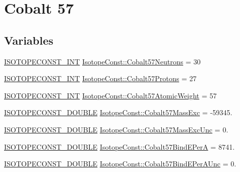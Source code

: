 \hypertarget{group___isotope_const-_cobalt-_co57}{}\section{Cobalt 57}
\label{group___isotope_const-_cobalt-_co57}
\subsection*{Variables}
\begin{DoxyCompactItemize}
\item 
\mbox{\hyperlink{group___isotope_const-_macros_ga5f18360b3e99483a35c32d789e62621c}{I\+S\+O\+T\+O\+P\+E\+C\+O\+N\+S\+T\+\_\+\+I\+NT}} \mbox{\hyperlink{group___isotope_const-_cobalt-_co57_gaf9f2bfeb3f2106f8ab6670a634de59d5}{Isotope\+Const\+::\+Cobalt57\+Neutrons}} = 30
\item 
\mbox{\hyperlink{group___isotope_const-_macros_ga5f18360b3e99483a35c32d789e62621c}{I\+S\+O\+T\+O\+P\+E\+C\+O\+N\+S\+T\+\_\+\+I\+NT}} \mbox{\hyperlink{group___isotope_const-_cobalt-_co57_ga35d91829ff3ccdaa6d97574cc31b4383}{Isotope\+Const\+::\+Cobalt57\+Protons}} = 27
\item 
\mbox{\hyperlink{group___isotope_const-_macros_ga5f18360b3e99483a35c32d789e62621c}{I\+S\+O\+T\+O\+P\+E\+C\+O\+N\+S\+T\+\_\+\+I\+NT}} \mbox{\hyperlink{group___isotope_const-_cobalt-_co57_gaead28edadef46c2ac4f55f1cf5341ceb}{Isotope\+Const\+::\+Cobalt57\+Atomic\+Weight}} = 57
\item 
\mbox{\hyperlink{group___isotope_const-_macros_ga8f45a7272ce02c0b4c65c44636ed719a}{I\+S\+O\+T\+O\+P\+E\+C\+O\+N\+S\+T\+\_\+\+D\+O\+U\+B\+LE}} \mbox{\hyperlink{group___isotope_const-_cobalt-_co57_ga7a65953d01a391d9e60573553a00bcb0}{Isotope\+Const\+::\+Cobalt57\+Mass\+Exc}} = -\/59345.
\item 
\mbox{\hyperlink{group___isotope_const-_macros_ga8f45a7272ce02c0b4c65c44636ed719a}{I\+S\+O\+T\+O\+P\+E\+C\+O\+N\+S\+T\+\_\+\+D\+O\+U\+B\+LE}} \mbox{\hyperlink{group___isotope_const-_cobalt-_co57_ga2180609495ba6f08e9964a3a653fb457}{Isotope\+Const\+::\+Cobalt57\+Mass\+Exc\+Unc}} = 0.
\item 
\mbox{\hyperlink{group___isotope_const-_macros_ga8f45a7272ce02c0b4c65c44636ed719a}{I\+S\+O\+T\+O\+P\+E\+C\+O\+N\+S\+T\+\_\+\+D\+O\+U\+B\+LE}} \mbox{\hyperlink{group___isotope_const-_cobalt-_co57_ga9387a90246b617ee416653e8ad1910b0}{Isotope\+Const\+::\+Cobalt57\+Bind\+E\+PerA}} = 8741.
\item 
\mbox{\hyperlink{group___isotope_const-_macros_ga8f45a7272ce02c0b4c65c44636ed719a}{I\+S\+O\+T\+O\+P\+E\+C\+O\+N\+S\+T\+\_\+\+D\+O\+U\+B\+LE}} \mbox{\hyperlink{group___isotope_const-_cobalt-_co57_gabc8e98aeb045354575142ae0f7127dcc}{Isotope\+Const\+::\+Cobalt57\+Bind\+E\+Per\+A\+Unc}} = 0.

\end{DoxyCompactItemize}
